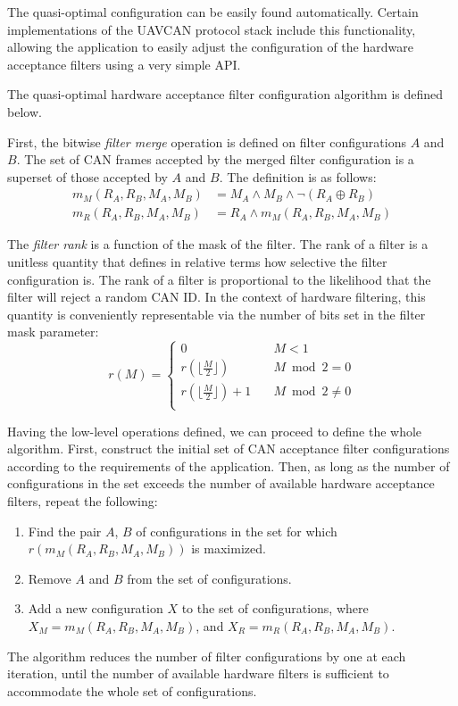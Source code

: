 The quasi-optimal configuration can be easily found automatically.
Certain implementations of the UAVCAN protocol stack include this functionality,
allowing the application to easily adjust the configuration of the hardware acceptance filters
using a very simple API.

The quasi-optimal hardware acceptance filter configuration algorithm is defined below.

First, the bitwise \emph{filter merge} operation is defined on filter configurations $A$ and $B$.
The set of CAN frames accepted by the merged filter configuration is a superset of
those accepted by $A$ and $B$.
The definition is as follows:
\begin{equation*}
\begin{split}
    m_M(R_A, R_B, M_A, M_B) & = M_A \land M_B \land \neg (R_A \oplus R_B) \\
    m_R(R_A, R_B, M_A, M_B) & = R_A \land m_M(R_A, R_B, M_A, M_B)
\end{split}
\end{equation*}

The \emph{filter rank} is a function of the mask of the filter.
The rank of a filter is a unitless quantity that defines in relative terms how selective the filter configuration is.
The rank of a filter is proportional to the likelihood that the filter will reject a random CAN ID.
In the context of hardware filtering, this quantity is conveniently representable via the number of bits set in
the filter mask parameter:
\begin{equation*}
r(M) =
\begin{cases}
    0                                   & \quad M < 1 \\
    r(\lfloor\frac{M}{2}\rfloor)        & \quad M \bmod 2 = 0 \\
    r(\lfloor\frac{M}{2}\rfloor) + 1    & \quad M \bmod 2 \neq 0 \\
\end{cases}
\end{equation*}

Having the low-level operations defined, we can proceed to define the whole algorithm.
First, construct the initial set of CAN acceptance filter configurations
according to the requirements of the application.
Then, as long as the number of configurations in the set exceeds the number of available hardware acceptance filters,
repeat the following:
\begin{enumerate}
    \item Find the pair $A$, $B$ of configurations in the set for which $r(m_M(R_A, R_B, M_A, M_B))$ is maximized.
    \item Remove $A$ and $B$ from the set of configurations.
    \item Add a new configuration $X$ to the set of configurations, where
    $X_M = m_M(R_A, R_B, M_A, M_B)$, and $X_R = m_R(R_A, R_B, M_A, M_B)$.
\end{enumerate}

The algorithm reduces the number of filter configurations by one at each iteration,
until the number of available hardware filters is sufficient to accommodate the whole set of configurations.
